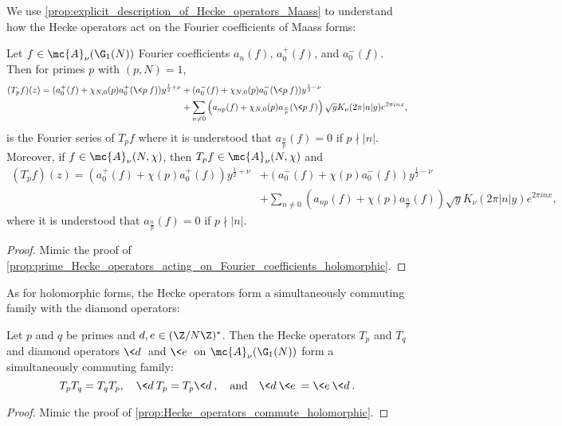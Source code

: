     We use \cref{prop:explicit_description_of_Hecke_operators_Maass} to understand how the Hecke operators act on the Fourier coefficients of Maass forms:

    \begin{proposition}\label{prop:prime_Hecke_operators_acting_on_Fourier_coefficients_Maass}
      Let $f \in \mc{A}_{\nu}(\G_{1}(N))$ Fourier coefficients $a_{n}(f)$, $a_{0}^{+}(f)$, and $a_{0}^{-}(f)$. Then for primes $p$ with $(p,N) = 1$,
      \begin{align*}
        (T_{p}f)(z) = (a_{0}^{+}(f)+\chi_{N,0}(p)a_{0}^{+}(\<p\>f))y^{\frac{1}{2}+\nu}&+(a_{0}^{-}(f)+\chi_{N,0}(p)a_{0}^{-}(\<p\>f))y^{\frac{1}{2}-\nu} \\
        &+ \sum_{n \neq 0}\left(a_{np}(f)+\chi_{N,0}(p)a_{\frac{n}{p}}(\<p\>f)\right)\sqrt{y}K_{\nu}(2\pi|n|y)e^{2\pi inx},
      \end{align*}
      is the Fourier series of $T_{p}f$ where it is understood that $a_{\frac{n}{p}}(f) = 0$ if $p \nmid |n|$. Moreover, if $f \in \mc{A}_{\nu}(N,\chi)$, then $T_{p}f \in \mc{A}_{\nu}(N,\chi)$ and
      \begin{align*}
        (T_{p}f)(z) = (a_{0}^{+}(f)+\chi(p)a_{0}^{+}(f))y^{\frac{1}{2}+\nu}&+(a_{0}^{-}(f)+\chi(p)a_{0}^{-}(f))y^{\frac{1}{2}-\nu} \\
        &+ \sum_{n \neq 0}\left(a_{np}(f)+\chi(p)a_{\frac{n}{p}}(f)\right)\sqrt{y}K_{\nu}(2\pi|n|y)e^{2\pi inx},
      \end{align*}
      where it is understood that $a_{\frac{n}{p}}(f) = 0$ if $p \nmid |n|$.
    \end{proposition}
    \begin{proof}
      Mimic the proof of \cref{prop:prime_Hecke_operators_acting_on_Fourier_coefficients_holomorphic}.
    \end{proof}

    As for holomorphic forms, the Hecke operators form a simultaneously commuting family with the diamond operators:

    \begin{proposition}\label{prop:Hecke_operators_commute_Maass}
      Let $p$ and $q$ be primes and $d,e \in (\Z/N\Z)^{\ast}$. Then the Hecke operators $T_{p}$ and $T_{q}$ and diamond operators $\<d\>$ and $\<e\>$ on $\mc{A}_{\nu}(\G_{1}(N))$ form a simultaneously commuting family:
      \[
        T_{p}T_{q} = T_{q}T_{p}, \quad \<d\>T_{p} = T_{p}\<d\>, \quad \text{and} \quad \<d\>\<e\> = \<e\>\<d\>.
      \]
    \end{proposition}
    \begin{proof}
      Mimic the proof of \cref{prop:Hecke_operators_commute_holomorphic}.
    \end{proof}

